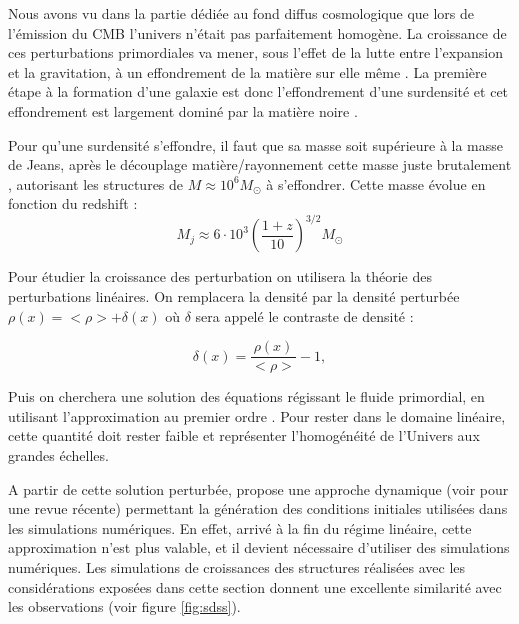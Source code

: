 Nous avons vu dans la partie dédiée au fond diffus cosmologique que lors de l'émission du \ac{CMB} l'univers n'était pas parfaitement homogène.
La croissance de ces perturbations primordiales va mener, sous l'effet de la lutte entre l'expansion et la gravitation, à un effondrement de la matière sur elle même \citep{1968ApJ...151..459S}.
La première étape à la formation d'une galaxie est donc l'effondrement d'une surdensité et cet effondrement est largement dominé par la matière noire \citep{1985ApJ...292..371D}.


Pour qu'une surdensité s'effondre, il faut que sa masse soit supérieure à la masse de Jeans, après le découplage matière/rayonnement cette masse juste brutalement \citep{2010gfe..book.....M}, autorisant les structures de $M \approx 10^6 M_\odot$ à s’effondrer.
Cette masse évolue en fonction du redshift \citep{2016PhR...645....1B} : 
\begin{equation}
M_j \approx 6 \cdot 10 ^3 \left( \frac{1+z}{10} \right)^{3/2} M_\odot
\end{equation}

Pour étudier la croissance des perturbation on utilisera la théorie des perturbations linéaires.
On remplacera la densité par la densité perturbée $\rho(x) = <\rho> + \delta(x)$ où $\delta$ sera appelé le contraste de densité :

\begin{equation}
\delta(x) = \frac{\rho(x)}{<\rho>} -1,
\end{equation}

Puis on cherchera une solution des équations régissant le fluide primordial, en utilisant l'approximation au premier ordre \citep{1999coph.book.....P}.
Pour rester dans le domaine linéaire, cette quantité doit rester faible et représenter l'homogénéité de l'Univers aux grandes échelles.

A partir de cette solution perturbée, \cite{1970A&A.....5...84Z} propose une approche dynamique (voir \cite{2014MNRAS.439.3630W} pour une revue récente) permettant la génération des conditions initiales utilisées dans les simulations numériques.
En effet, arrivé à la fin du régime linéaire, cette approximation n'est plus valable, et il devient nécessaire d'utiliser des simulations numériques.
Les simulations de croissances des structures réalisées avec les considérations exposées dans cette section donnent une excellente similarité avec les observations (voir figure \ref{fig:sdss}).

